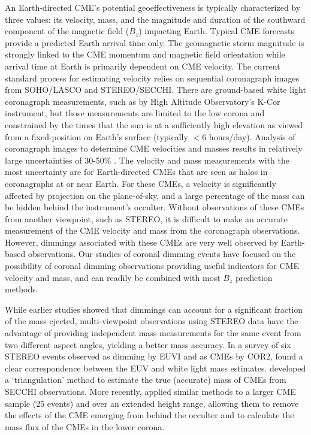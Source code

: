 An Earth-directed CME’s potential geoeffectiveness is typically characterized by three values: its velocity, mass, and the magnitude and duration of the southward component of the magnetic field ($B_z$) impacting Earth. Typical CME forecasts provide a predicted Earth arrival time only. The geomagnetic storm magnitude is strongly linked to the CME momentum and magnetic field orientation while arrival time at Earth is primarily dependent on CME velocity. The current standard process for estimating velocity relies on sequential coronagraph images from SOHO/LASCO and STEREO/SECCHI. There are ground-based white light coronagraph measurements, such as by High Altitude Observatory’s K-Cor instrument, but those measurements are limited to the low corona and constrained by the times that the sun is at a sufficiently high elevation as viewed from a fixed-position on Earth’s surface (typically $<$6 hours/day). Analysis of coronagraph images to determine CME velocities and masses results in relatively large uncertainties of 30-50\% \citep{Vourlidas2000, Vourlidas2010, Vourlidas2011}. The velocity and mass measurements with the most uncertainty are for Earth-directed CMEs that are seen as halos in coronagraphs at or near Earth. For these CMEs, a velocity is significantly affected by projection on the plane-of-sky, and a large percentage of the mass can be hidden behind the instrument’s occulter. Without observations of these CMEs from another viewpoint, such as STEREO, it is difficult to make an accurate measurement of the CME velocity and mass from the coronagraph observations. However, dimmings associated with these CMEs are very well observed by Earth-based observations. Our studies of coronal dimming events have focused on the possibility of coronal dimming observations providing useful indicators for CME velocity and mass, and can readily be combined with most $B_z$ prediction methods.

While earlier studies showed that dimmings can account for a significant fraction of the mass ejected, multi-viewpoint observations using STEREO data have the advantage of providing independent mass measurements for the same event from two different aspect angles, yielding a better mass accuracy. In a survey of six STEREO events observed as dimming by EUVI and as CMEs by COR2, \citet{Aschwanden2009} found a clear correspondence between the EUV and white light mass estimates. \citet{Colaninno2009} developed a ‘triangulation’ method to estimate the true (accurate) mass of CMEs from SECCHI observations. More recently, \citet{Bein2013} applied similar methods to a larger CME sample (25 events) and over an extended height range, allowing them to remove the effects of the CME emerging from behind the occulter and to calculate the mass flux of the CMEs in the lower corona.

